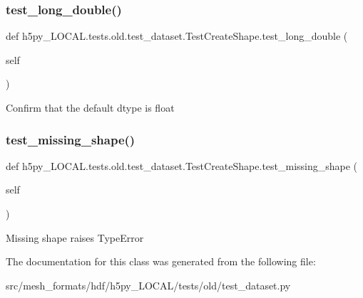 \subsubsection{\texorpdfstring{test\+\_\+long\+\_\+double()}{test\_long\_double()}}
{\footnotesize\ttfamily def h5py\+\_\+\+L\+O\+C\+A\+L.\+tests.\+old.\+test\+\_\+dataset.\+Test\+Create\+Shape.\+test\+\_\+long\+\_\+double (\begin{DoxyParamCaption}\item[{}]{self }\end{DoxyParamCaption})}

\begin{DoxyVerb}Confirm that the default dtype is float \end{DoxyVerb}
 \mbox{\label{classh5py__LOCAL_1_1tests_1_1old_1_1test__dataset_1_1TestCreateShape_ac28fffdad58d04ea1874fe4ce6a6580f}} 
\subsubsection{\texorpdfstring{test\+\_\+missing\+\_\+shape()}{test\_missing\_shape()}}
{\footnotesize\ttfamily def h5py\+\_\+\+L\+O\+C\+A\+L.\+tests.\+old.\+test\+\_\+dataset.\+Test\+Create\+Shape.\+test\+\_\+missing\+\_\+shape (\begin{DoxyParamCaption}\item[{}]{self }\end{DoxyParamCaption})}

\begin{DoxyVerb}Missing shape raises TypeError \end{DoxyVerb}
 

The documentation for this class was generated from the following file\+:\begin{DoxyCompactItemize}
\item 
src/mesh\+\_\+formats/hdf/h5py\+\_\+\+L\+O\+C\+A\+L/tests/old/test\+\_\+dataset.\+py\end{DoxyCompactItemize}
